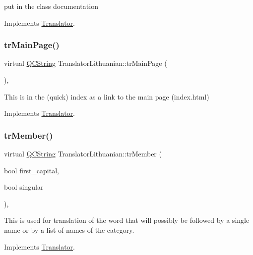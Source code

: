 put in the class documentation 

Implements \mbox{\hyperlink{class_translator}{Translator}}.

\mbox{\label{class_translator_lithuanian_a6e974d324e7e1eac3e9043612d4958d7}} 
\subsubsection{\texorpdfstring{trMainPage()}{trMainPage()}}
{\footnotesize\ttfamily virtual \mbox{\hyperlink{class_q_c_string}{Q\+C\+String}} Translator\+Lithuanian\+::tr\+Main\+Page (\begin{DoxyParamCaption}{ }\end{DoxyParamCaption})\hspace{0.3cm}{\ttfamily [inline]}, {\ttfamily [virtual]}}

This is in the (quick) index as a link to the main page (index.\+html) 

Implements \mbox{\hyperlink{class_translator}{Translator}}.

\mbox{\label{class_translator_lithuanian_a4ee40ef3963fde0dc6d0bbd58c261a76}} 
\subsubsection{\texorpdfstring{trMember()}{trMember()}}
{\footnotesize\ttfamily virtual \mbox{\hyperlink{class_q_c_string}{Q\+C\+String}} Translator\+Lithuanian\+::tr\+Member (\begin{DoxyParamCaption}\item[{bool}]{first\+\_\+capital,  }\item[{bool}]{singular }\end{DoxyParamCaption})\hspace{0.3cm}{\ttfamily [inline]}, {\ttfamily [virtual]}}

This is used for translation of the word that will possibly be followed by a single name or by a list of names of the category. 

Implements \mbox{\hyperlink{class_translator}{Translator}}.

